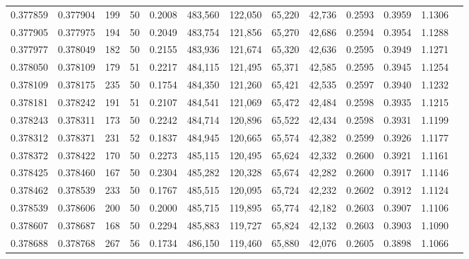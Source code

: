 \begin{tabular}{rrrrrrrrrrrrr}
0.377859 & 0.377904 &   199 &  50 &                                     0.2008 & 483,560 & 122,050 &  65,220 &  42,736 & 0.2593 & 0.3959 & 1.1306 \\
0.377905 & 0.377975 &   194 &  50 &                                     0.2049 & 483,754 & 121,856 &  65,270 &  42,686 & 0.2594 & 0.3954 & 1.1288 \\
0.377977 & 0.378049 &   182 &  50 &                                     0.2155 & 483,936 & 121,674 &  65,320 &  42,636 & 0.2595 & 0.3949 & 1.1271 \\
0.378050 & 0.378109 &   179 &  51 &                                     0.2217 & 484,115 & 121,495 &  65,371 &  42,585 & 0.2595 & 0.3945 & 1.1254 \\
0.378109 & 0.378175 &   235 &  50 &                                     0.1754 & 484,350 & 121,260 &  65,421 &  42,535 & 0.2597 & 0.3940 & 1.1232 \\
0.378181 & 0.378242 &   191 &  51 &                                     0.2107 & 484,541 & 121,069 &  65,472 &  42,484 & 0.2598 & 0.3935 & 1.1215 \\
0.378243 & 0.378311 &   173 &  50 &                                     0.2242 & 484,714 & 120,896 &  65,522 &  42,434 & 0.2598 & 0.3931 & 1.1199 \\
0.378312 & 0.378371 &   231 &  52 &                                     0.1837 & 484,945 & 120,665 &  65,574 &  42,382 & 0.2599 & 0.3926 & 1.1177 \\
0.378372 & 0.378422 &   170 &  50 &                                     0.2273 & 485,115 & 120,495 &  65,624 &  42,332 & 0.2600 & 0.3921 & 1.1161 \\
0.378425 & 0.378460 &   167 &  50 &                                     0.2304 & 485,282 & 120,328 &  65,674 &  42,282 & 0.2600 & 0.3917 & 1.1146 \\
0.378462 & 0.378539 &   233 &  50 &                                     0.1767 & 485,515 & 120,095 &  65,724 &  42,232 & 0.2602 & 0.3912 & 1.1124 \\
0.378539 & 0.378606 &   200 &  50 &                                     0.2000 & 485,715 & 119,895 &  65,774 &  42,182 & 0.2603 & 0.3907 & 1.1106 \\
0.378607 & 0.378687 &   168 &  50 &                                     0.2294 & 485,883 & 119,727 &  65,824 &  42,132 & 0.2603 & 0.3903 & 1.1090 \\
0.378688 & 0.378768 &   267 &  56 &                                     0.1734 & 486,150 & 119,460 &  65,880 &  42,076 & 0.2605 & 0.3898 & 1.1066 \\

\end{tabular}
